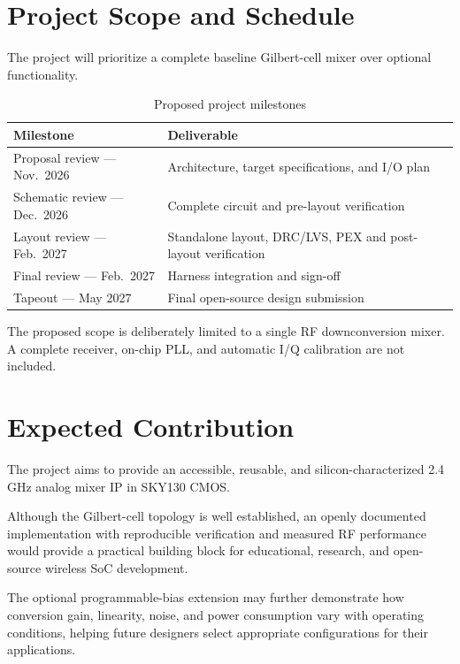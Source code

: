 \documentclass[11pt,letterpaper]{article}
\begin{document}
\section{Project Scope and Schedule}

The project will prioritize a complete baseline
Gilbert-cell mixer over optional functionality.

\begin{table}[htbp]
\centering
\caption{Proposed project milestones}
\label{tab:milestones}
\begin{tabularx}{\textwidth}{@{}p{}Y@{}}
\toprule
\textbf{Milestone} & \textbf{Deliverable} \\
\midrule

Proposal review --- Nov.\ 2026 &
Architecture, target specifications, and I/O plan \\

Schematic review --- Dec.\ 2026 &
Complete circuit and pre-layout verification \\

Layout review --- Feb.\ 2027 &
Standalone layout, DRC/LVS, PEX and post-layout
verification \\

Final review --- Feb.\ 2027 &
Harness integration and sign-off \\

Tapeout --- May 2027 &
Final open-source design submission \\

\bottomrule
\end{tabularx}
\end{table}

The proposed scope is deliberately limited to a
single RF downconversion mixer. A complete receiver,
on-chip PLL, and automatic I/Q calibration are not
included.


\section{Expected Contribution}

The project aims to provide an accessible, reusable,
and silicon-characterized 2.4 GHz analog mixer IP
in SKY130 CMOS.

Although the Gilbert-cell topology is well established,
an openly documented implementation with reproducible
verification and measured RF performance would provide
a practical building block for educational, research,
and open-source wireless SoC development.

The optional programmable-bias extension may further
demonstrate how conversion gain, linearity, noise, and
power consumption vary with operating conditions,
helping future designers select appropriate
configurations for their applications.
\end{document}
